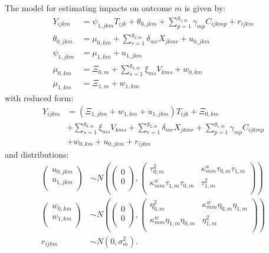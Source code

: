 \documentclass[12pt]{article}
\begin{document}
The model for estimating impacts on outcome $m$ is given by:
\begin{align}
Y_{ijkm} &= \psi_{1,jkm} T_{ijk} + \theta_{0,jkm} + \sum_{p=1}^{g_{1,m}} \gamma_{mp} C_{ijkmp} + r_{ijkm}\\
\nonumber \theta_{0,jkm} &= \mu_{0,km} + \sum_{r=1}^{g_{2,m}} \delta_{mr} X_{jkmr} + u_{0,jkm}\\
\nonumber \psi_{1,jkm} &= \mu_{1,km} + u_{1,jkm} \\
\nonumber \mu_{0,km}  &= \Xi_{0,m} + \sum_{s=1}^{g_{3,m}} \xi_{ms} V_{kms} + w_{0,km}\\
\nonumber \mu_{1,km}  &= \Xi_{1,m} + w_{1,km}
\end{align}
with reduced form:
\begin{align}
Y_{ijkm} &= \left(\Xi_{1,jkm} + w_{1,km} + u_{1,jkm}\right) T_{ijk} + \Xi_{0,km} \\
\nonumber & + \sum_{s=1}^{g_{3,m}} \xi_{ms} V_{kms} + \sum_{r=1}^{g_{2,m}} \delta_{mr} X_{jkmr} + \sum_{p=1}^{g_{1,m}} \gamma_{mp} C_{ijkmp}\\
 \nonumber &+ w_{0,km} + u_{0,jkm} + r_{ijkm}
\end{align}
and distributions:
\begin{align}
\begin{pmatrix} u_{0, jkm} \\ u_{1,jkm}\\ \end{pmatrix} &\sim
N\left(\begin{pmatrix} 0 \\ 0\\ \end{pmatrix}, \begin{pmatrix} \tau^2_{0,m} & \kappa^u_{mm} \tau_{0,m} \tau_{1,m} \\ \kappa^u_{mm} \tau_{1,m} \tau_{0,m} & \tau^2_{1,m} \\ \end{pmatrix}\right) \\
\nonumber \begin{pmatrix} w_{0, km} \\ w_{1,km}\\ \end{pmatrix} &\sim
N\left( \begin{pmatrix} 0 \\ 0\\ \end{pmatrix}, \begin{pmatrix} \eta^2_{0,m} & \kappa^w_{mm} \eta_{0,m} \eta_{1,m} \\ \kappa^w_{mm} \eta_{1,m} \eta_{0,m} & \eta^2_{1,m} \\ \end{pmatrix}\right) \\
\nonumber r_{ijkm} &\sim N\left(0, \sigma^2_m\right).
\end{align}
\end{document}
